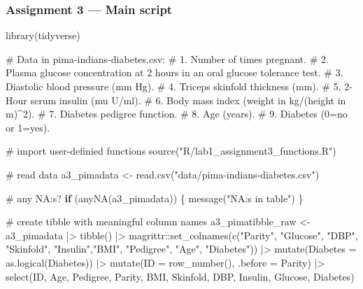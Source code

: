 \documentclass[
  english,
  11pt,
]{article}
\newenvironment{Shaded}{\begin{snugshade}}{\end{snugshade}}
\newcommand{\AttributeTok}[1]{\textcolor[rgb]{0.40,0.45,0.13}{#1}}
\newcommand{\CommentTok}[1]{\textcolor[rgb]{0.37,0.37,0.37}{#1}}
\newcommand{\ControlFlowTok}[1]{\textcolor[rgb]{0.00,0.23,0.31}{\textbf{#1}}}
\newcommand{\FunctionTok}[1]{\textcolor[rgb]{0.28,0.35,0.67}{#1}}
\newcommand{\NormalTok}[1]{\textcolor[rgb]{0.00,0.23,0.31}{#1}}
\newcommand{\OtherTok}[1]{\textcolor[rgb]{0.00,0.23,0.31}{#1}}
\newcommand{\SpecialCharTok}[1]{\textcolor[rgb]{0.37,0.37,0.37}{#1}}
\newcommand{\StringTok}[1]{\textcolor[rgb]{0.13,0.47,0.30}{#1}}
\begin{document}
\subsubsection{Assignment 3 --- Main
script}\label{assignment-3-main-script}

\begin{Shaded}
\begin{Highlighting}[]
\FunctionTok{library}\NormalTok{(tidyverse)}

\CommentTok{\# Data in pima{-}indians{-}diabetes.csv:}
\CommentTok{\# 1. Number of times pregnant.}
\CommentTok{\# 2. Plasma glucose concentration at 2 hours in an oral glucose tolerance test.}
\CommentTok{\# 3. Diastolic blood pressure (mm Hg).}
\CommentTok{\# 4. Triceps skinfold thickness (mm).}
\CommentTok{\# 5. 2{-}Hour serum insulin (mu U/ml).}
\CommentTok{\# 6. Body mass index (weight in kg/(height in m)\^{}2).}
\CommentTok{\# 7. Diabetes pedigree function.}
\CommentTok{\# 8. Age (years).}
\CommentTok{\# 9. Diabetes (0=no or 1=yes).}

\CommentTok{\# import user{-}definied functions}
\FunctionTok{source}\NormalTok{(}\StringTok{"R/lab1\_assignment3\_functions.R"}\NormalTok{)}

\CommentTok{\# read data}
\NormalTok{a3\_pimadata }\OtherTok{\textless{}{-}} \FunctionTok{read.csv}\NormalTok{(}\StringTok{"data/pima{-}indians{-}diabetes.csv"}\NormalTok{)}

\CommentTok{\# any NA:s?}
\ControlFlowTok{if}\NormalTok{ (}\FunctionTok{anyNA}\NormalTok{(a3\_pimadata)) \{}
  \FunctionTok{message}\NormalTok{(}\StringTok{"NA:s in table"}\NormalTok{)}
\NormalTok{\}}

\CommentTok{\# create tibble with meaningful column names}
\NormalTok{a3\_pimatibble\_raw }\OtherTok{\textless{}{-}}
\NormalTok{  a3\_pimadata }\SpecialCharTok{|\textgreater{}}
  \FunctionTok{tibble}\NormalTok{() }\SpecialCharTok{|\textgreater{}}
\NormalTok{  magrittr}\SpecialCharTok{::}\FunctionTok{set\_colnames}\NormalTok{(}\FunctionTok{c}\NormalTok{(}\StringTok{"Parity"}\NormalTok{, }\StringTok{"Glucose"}\NormalTok{, }\StringTok{"DBP"}\NormalTok{, }\StringTok{"Skinfold"}\NormalTok{,}
                           \StringTok{"Insulin"}\NormalTok{,}\StringTok{"BMI"}\NormalTok{, }\StringTok{"Pedigree"}\NormalTok{, }\StringTok{"Age"}\NormalTok{, }\StringTok{"Diabetes"}\NormalTok{)) }\SpecialCharTok{|\textgreater{}}
  \FunctionTok{mutate}\NormalTok{(}\AttributeTok{Diabetes =} \FunctionTok{as.logical}\NormalTok{(Diabetes)) }\SpecialCharTok{|\textgreater{}}
  \FunctionTok{mutate}\NormalTok{(}\AttributeTok{ID =} \FunctionTok{row\_number}\NormalTok{(), }\AttributeTok{.before =}\NormalTok{ Parity) }\SpecialCharTok{|\textgreater{}}
  \FunctionTok{select}\NormalTok{(ID, Age, Pedigree, Parity, BMI, Skinfold,}
\NormalTok{         DBP, Insulin, Glucose, Diabetes)}


\end{Highlighting}
\end{Shaded}
\end{document}

